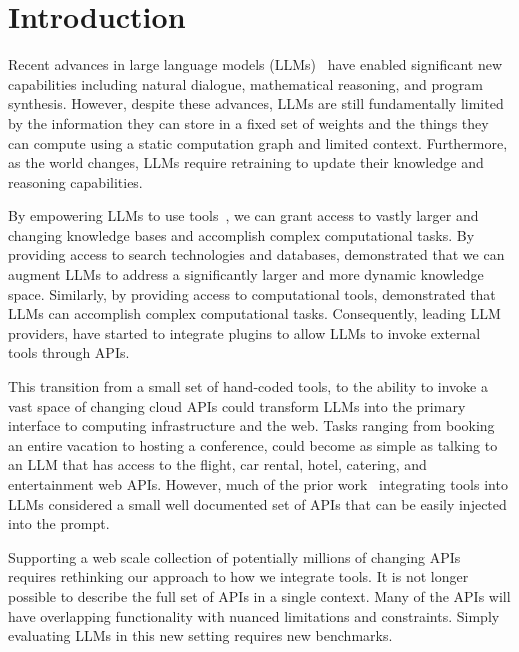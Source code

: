 \section{Introduction}
\label{sec:intro}

Recent advances in large language models (LLMs)~\cite{chowdhery2022palm, brown2020language, scao2022bloom, bubeck2023sparks, openai2023gpt4, ChatGPT} have enabled significant new capabilities including natural dialogue, mathematical reasoning, and program synthesis. 
However, despite these advances, LLMs are still fundamentally limited by the information they can store in a fixed set of weights and the things they can compute using a static computation graph and limited context. 
Furthermore, as the world changes, LLMs require retraining to update their knowledge and reasoning capabilities. 

By empowering LLMs to use tools~\cite{schick2023toolformer}, we can grant access to vastly larger and changing knowledge bases and accomplish complex computational tasks.
By providing access to search technologies and databases, \cite{nakano2021webgpt, thoppilan2022lamda, shuster2022blenderbot} demonstrated that we can augment LLMs to address a significantly larger and more dynamic knowledge space. 
Similarly, by providing access to computational tools, \cite{thoppilan2022lamda, andor2019giving} demonstrated that LLMs can accomplish complex computational tasks. 
Consequently, leading LLM providers\cite{openai2023gpt4}, have started to integrate plugins to allow LLMs to invoke external tools through APIs.

This transition from a small set of hand-coded tools, to the ability to invoke a vast space of changing cloud APIs could transform LLMs into the primary interface to computing infrastructure and the web. 
Tasks ranging from booking an entire vacation to hosting a conference, could become as simple as talking to an LLM that has access to the flight, car rental, hotel, catering, and entertainment web APIs. 
However, much of the prior work~\cite{shen2023hugginggpt, liang2023taskmatrix} integrating tools into LLMs considered a small well documented set of APIs that can be easily injected into the prompt.

Supporting a web scale collection of potentially millions of changing APIs requires rethinking our approach to how we integrate tools.
It is not longer possible to describe the full set of APIs in a single context. 
Many of the APIs will have overlapping functionality with nuanced limitations and constraints. 
Simply evaluating LLMs in this new setting requires new benchmarks.



